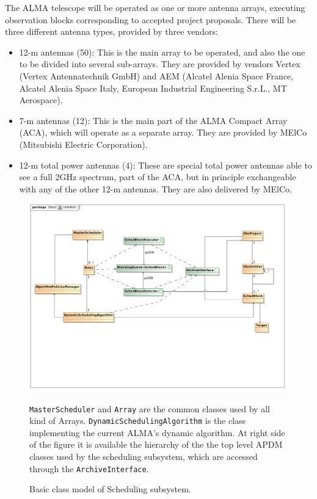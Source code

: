 The ALMA telescope will be operated as one or more antenna arrays, executing observation blocks corresponding to accepted project proposals. There will be three different antenna types, provided by three vendors:
\begin{itemize}
\item 12-m antennas (50): This is the main array to be operated, and also the one to be divided into several sub-arrays. They are provided by vendors Vertex (Vertex Antennatechnik GmbH) and AEM (Alcatel Alenia Space France, Alcatel Alenia Space Italy, European Industrial Engineering S.r.L., MT Aerospace).

\item 7-m antennas (12): This is the main part of the ALMA Compact Array (ACA), which will  operate as a separate array. They are provided by MElCo (Mitsubishi Electric Corporation).

\item 12-m total power antennas (4): These are special total power antennas able to see a full 2GHz spectrum, part of the ACA, but in principle exchangeable with any of the other 12-m antennas. They are also delivered by MElCo.

\end{itemize}

\begin{figure}	
\begin{center}
\includegraphics[width=\textwidth]{images/scheduling_class_model}
\caption{Basic class model of Scheduling subsystem.}
\end{center}
 \texttt{MasterScheduler} and \texttt{Array} are the common classes used by all kind of Arrays. \texttt{DynamicSchedulingAlgorithm} is the class implementing the current ALMA's dynamic algorithm. At right side of the figure it is available the hierarchy of the the top level APDM classes used by the scheduling subsystem, which are accessed through the \texttt{ArchiveInterface}.
\label{fig:sched-class-model}
\end{figure}

